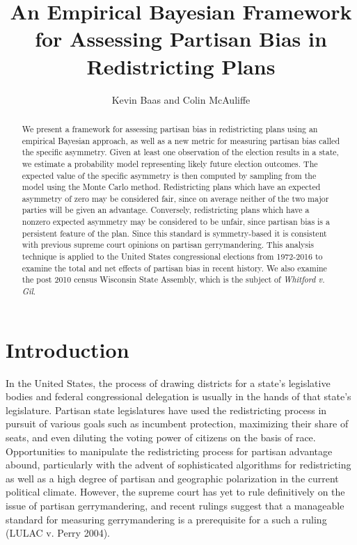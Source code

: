 \documentclass[preprint,12pt]{article}
\begin{document}
\title{An Empirical Bayesian Framework for Assessing Partisan Bias in Redistricting Plans}

\author{Kevin Baas and Colin McAuliffe}

\maketitle

\begin{abstract}
We present a framework for assessing partisan bias in redistricting plans using an empirical Bayesian approach, as well as a new metric for measuring partisan bias called the specific asymmetry.
Given at least one observation of the election results in a state, we estimate a probability model representing likely future election outcomes.
The expected value of the specific asymmetry is then computed by sampling from the model using the Monte Carlo method.
Redistricting plans which have an expected asymmetry of zero may be considered fair, since on average neither of the two major parties will be given an advantage.
Conversely, redistricting plans which have a nonzero expected asymmetry may be considered to be unfair, since partisan bias is a persistent feature of the plan.
Since this standard is symmetry-based it is consistent with previous supreme court opinions on partisan gerrymandering.
This analysis technique is applied to the United States congressional elections from 1972-2016 to examine the total and net effects of partisan bias in recent history.
We also examine the post 2010 census Wisconsin State Assembly, which is the subject of \emph{Whitford v. Gil}.

\end{abstract}

\section{Introduction}
In the United States, the process of drawing districts for a state's legislative bodies and federal congressional delegation is usually in the hands of that state's legislature.
Partisan state legislatures have used the redistricting process in pursuit of various goals such as incumbent protection, maximizing their share of seats, and even diluting the voting power of citizens on the basis of race.
Opportunities to manipulate the redistricting process for partisan advantage abound, particularly with the advent of sophisticated algorithms for redistricting as well as a high degree of partisan and geographic polarization in the current political climate.
However, the supreme court has yet to rule definitively on the issue of partisan gerrymandering, and recent rulings suggest that a manageable standard for measuring gerrymandering is a prerequisite for a such a ruling (LULAC v. Perry 2004).
\end{document}
